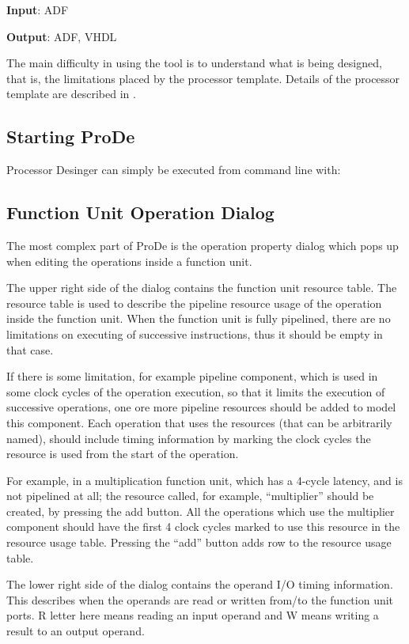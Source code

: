 \documentclass[twoside]{tceusermanual}
\begin{document}
\textbf{Input}: ADF

\textbf{Output}: ADF, VHDL

The main difficulty in using the tool is to understand what is being
designed, that is, the limitations placed by the processor template. 
Details of the processor template are described in \cite{ADF-specs}.


\subsection{Starting ProDe}

Processor Desinger can simply be executed from command line with:


\subsection{Function Unit Operation Dialog}

The most complex part of ProDe is the operation property dialog which pops
up when editing the operations inside a function unit.


The upper right side of the dialog contains the function unit resource table.
The resource table is used to describe the pipeline resource usage of the
operation inside the function unit.
When the function unit is fully pipelined, there are no limitations on
executing of successive instructions, thus it should be empty in that case.

If there is some limitation, for example pipeline component, which is used in 
some clock cycles of the operation execution, so that it limits the execution of 
successive operations, one ore more pipeline resources should be added to model 
this component. Each operation that uses the resources (that can be arbitrarily
named), should include timing information by marking the clock cycles the resource
is used from the start of the operation.

For example, in a multiplication function unit, which has a 4-cycle latency,
and is not pipelined at all; the resource called, for example, ``multiplier'' 
should be created, by pressing the add button. All the operations which use the 
multiplier component should have the first 4 clock cycles marked to use this 
resource in the resource usage table. Pressing the ``add'' button adds row to 
the resource usage table.

The lower right side of the dialog contains the operand I/O timing information.
This describes when the operands are read or written from/to the function unit
ports. R letter here means reading an input operand and W means writing a result to 
an output operand.
\end{document}
